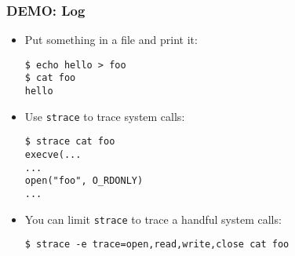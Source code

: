 \begin{frame}[fragile]

\frametitle{DEMO: Log}

\begin{itemize}

\item Put something in a file and print it:

\begin{verbatim}
$ echo hello > foo
$ cat foo
hello
\end{verbatim}

\item Use \texttt{strace} to trace system calls:

\begin{verbatim}
$ strace cat foo 
execve(...
...
open("foo", O_RDONLY)
...
\end{verbatim}

\item You can limit \texttt{strace} to trace a handful system calls:

\begin{verbatim}
$ strace -e trace=open,read,write,close cat foo
\end{verbatim}

\end{itemize}

\end{frame}
